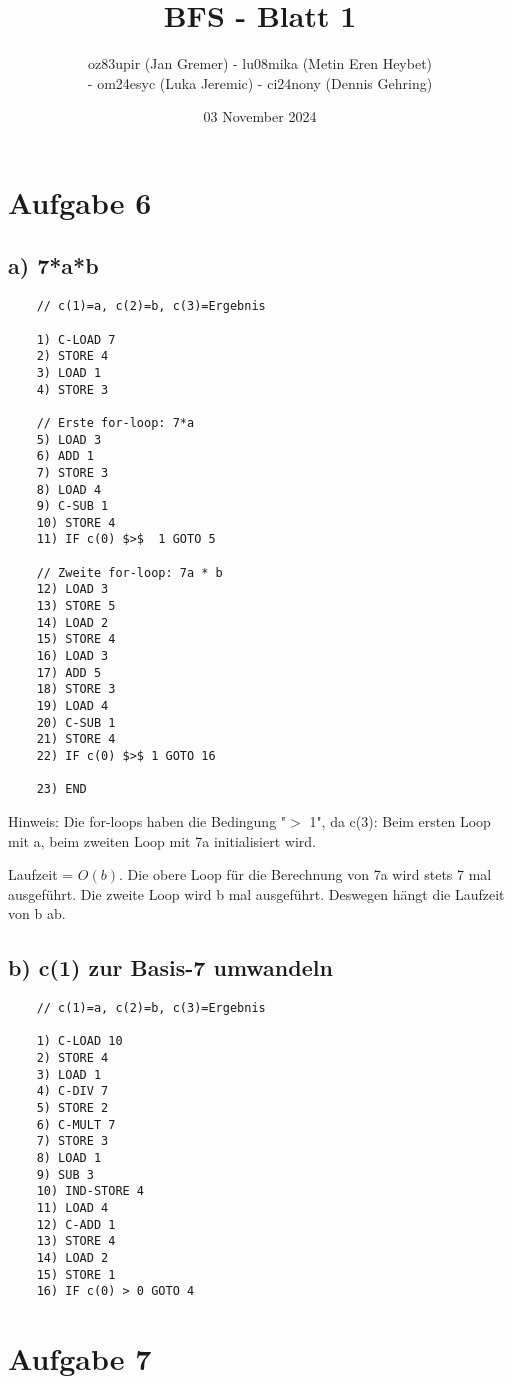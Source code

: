\documentclass[11pt]{article}
\title{BFS - Blatt 1}
\author{oz83upir (Jan Gremer) - lu08mika (Metin Eren Heybet)\\
 - om24esyc (Luka Jeremic) - ci24nony (Dennis Gehring)}
\date{03 November 2024}
\begin{document}
\maketitle

\section*{Aufgabe 6}

\subsection*{a) 7*a*b}

\begin{verbatim}
    // c(1)=a, c(2)=b, c(3)=Ergebnis
    
    1) C-LOAD 7
    2) STORE 4
    3) LOAD 1
    4) STORE 3

    // Erste for-loop: 7*a
    5) LOAD 3
    6) ADD 1
    7) STORE 3
    8) LOAD 4
    9) C-SUB 1
    10) STORE 4
    11) IF c(0) $>$  1 GOTO 5

    // Zweite for-loop: 7a * b
    12) LOAD 3
    13) STORE 5
    14) LOAD 2
    15) STORE 4
    16) LOAD 3
    17) ADD 5
    18) STORE 3
    19) LOAD 4
    20) C-SUB 1
    21) STORE 4
    22) IF c(0) $>$ 1 GOTO 16

    23) END
\end{verbatim}

Hinweis: Die for-loops haben die Bedingung "$>$ 1", da c(3):
Beim ersten Loop mit a, beim zweiten Loop mit 7a initialisiert wird.

Laufzeit = \boldmath$O(b)$\unboldmath. Die obere Loop für die Berechnung von 7a wird stets 7 mal ausgeführt.
 Die zweite Loop wird b mal ausgeführt. Deswegen hängt die Laufzeit von b ab.

\subsection*{b) c(1) zur Basis-7 umwandeln}

\begin{verbatim}
    // c(1)=a, c(2)=b, c(3)=Ergebnis
    
    1) C-LOAD 10
    2) STORE 4
    3) LOAD 1
    4) C-DIV 7
    5) STORE 2
    6) C-MULT 7
    7) STORE 3
    8) LOAD 1
    9) SUB 3
    10) IND-STORE 4
    11) LOAD 4
    12) C-ADD 1
    13) STORE 4
    14) LOAD 2
    15) STORE 1
    16) IF c(0) > 0 GOTO 4
\end{verbatim}

\section*{Aufgabe 7}
\end{document}
